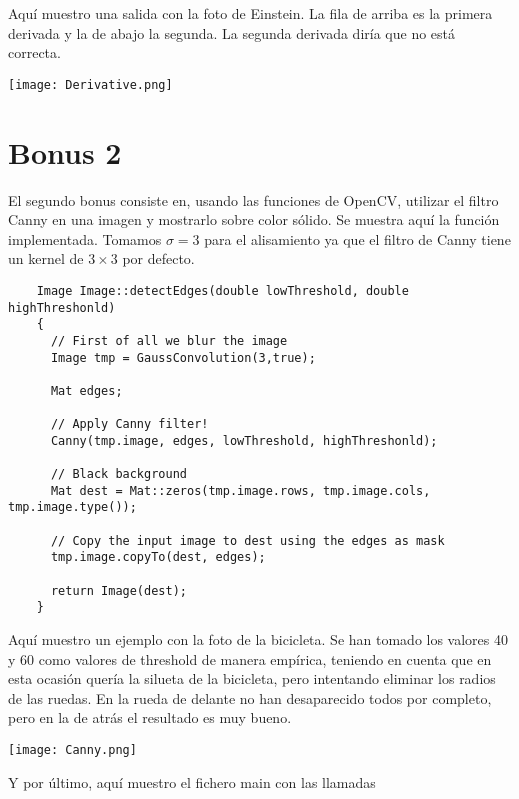 \documentclass[a4paper, 11pt]{article}
\theoremstyle{definition}
\begin{document}
  Aquí muestro una salida con la foto de Einstein. La fila de arriba es la primera
  derivada y la de abajo la segunda. La segunda derivada diría que no está correcta.

  \centerline{\texttt{[image: Derivative.png]}}

  \section{Bonus 2}

  El segundo bonus consiste en, usando las funciones de OpenCV, utilizar el filtro
  Canny en una imagen y mostrarlo sobre color sólido. Se muestra aquí la función
  implementada. Tomamos $\sigma=3$ para el alisamiento ya que el filtro de Canny
  tiene un kernel de $3\times3$ por defecto.

  \begin{lstlisting}
    Image Image::detectEdges(double lowThreshold, double highThreshonld)
    {
      // First of all we blur the image
      Image tmp = GaussConvolution(3,true);

      Mat edges;

      // Apply Canny filter!
      Canny(tmp.image, edges, lowThreshold, highThreshonld);

      // Black background
      Mat dest = Mat::zeros(tmp.image.rows, tmp.image.cols, tmp.image.type());

      // Copy the input image to dest using the edges as mask
      tmp.image.copyTo(dest, edges);

      return Image(dest);
    }
  \end{lstlisting}

  Aquí muestro un ejemplo con la foto de la bicicleta. Se han tomado los valores
  40 y 60 como valores de threshold de manera empírica, teniendo en cuenta que
  en esta ocasión quería la silueta de la bicicleta, pero intentando eliminar los
  radios de las ruedas. En la rueda de delante no han desaparecido todos por completo,
  pero en la de atrás el resultado es muy bueno.


  \centerline{\texttt{[image: Canny.png]}}

  Y por último, aquí muestro el fichero main con las llamadas
\end{document}
